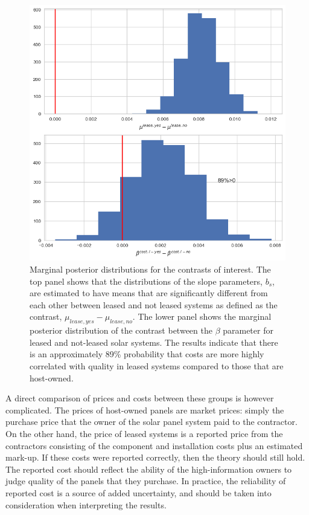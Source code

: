 \documentclass[12pt]{article}
\begin{document}
\begin{figure}
  \includegraphics[width=1\linewidth]{figures/bayes_hypos.png}
  \caption{Marginal posterior distributions for the contrasts of interest. The top panel shows that the distributions of the slope parameters, $b_s$, are estimated to have means that are significantly different from each other between leased and not leased systems as defined as the contrast, $\mu_{lease, yes} - \mu_{lease, no}$. The lower panel shows the marginal posterior distribution of the contrast between the $\beta$ parameter for leased and not-leased solar systems. The results indicate that there is an approximately 89\% probability that costs are more highly correlated with quality in leased systems compared to those that are host-owned.}
  \label{fig:contrasts}
\end{figure}

A direct comparison of prices and costs between these groups is however complicated. The prices of host-owned panels are market prices: simply the purchase price that the owner of the solar panel system paid to the contractor. On the other hand, the price of leased systems is a reported price from the contractors consisting of the component and installation costs plus an estimated mark-up. If these costs were reported correctly, then the theory should still hold. The reported cost should reflect the ability of the high-information owners to judge quality of the panels that they purchase. In practice, the reliability of reported cost is a source of added uncertainty, and should be taken into consideration when interpreting the results.
\end{document}
